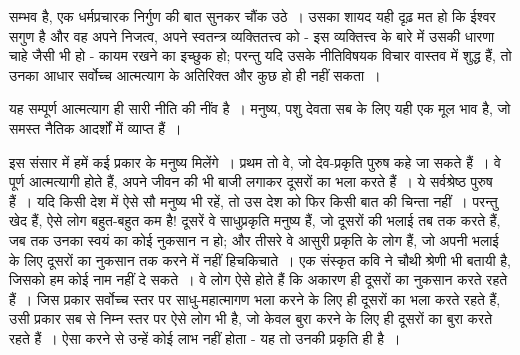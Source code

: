 \vskip 2pt

सम्भव है, एक धर्मप्रचारक निर्गुण की बात सुनकर चौंक उठे~। उसका शायद यही दृढ़ मत हो कि ईश्वर सगुण है और वह अपने निजत्व, अपने स्वतन्त्र व्यक्तितत्त्व को - इस व्यक्तित्त्व के बारे में उसकी धारणा चाहे जैसी भी हो - कायम रखने का इच्छुक हो; परन्तु यदि उसके नीतिविषयक विचार वास्तव में शुद्ध हैं, तो उनका आधार सर्वोच्च आत्मत्याग के अतिरिक्त और कुछ हो ही नहीं सकता~।

यह सम्पूर्ण आत्मत्याग ही सारी नीति की नींव है~। मनुष्य, पशु देवता सब के लिए यही एक मूल भाव है, जो समस्त नैतिक आदर्शों में व्याप्त हैं~।

इस संसार में हमें कई प्रकार के मनुष्य मिलेंगे~। प्रथम तो वे, जो देव-प्रकृति पुरुष कहे जा सकते हैं~। वे पूर्ण आत्मत्यागी होते हैं, अपने जीवन की भी बाजी लगाकर दूसरों का भला करते हैं~। ये सर्वश्रेष्ठ पुरुष हैं~। यदि किसी देश में ऐसे सौ मनुष्य भी रहें, तो उस देश को फिर किसी बात की चिन्ता नहीं~। परन्तु खेद हैं, ऐसे लोग बहुत-बहुत कम है! दूसरें वे साधुप्रकृति मनुष्य हैं, जो दूसरों की भलाई तब तक करते हैं, जब तक उनका स्वयं का कोई नुकसान न हो; और तीसरे वे आसुरी प्रकृति के लोग हैं, जो अपनी भलाई के लिए दूसरों का नुकसान तक करने में नहीं हिचकिचाते~। एक संस्कृत कवि ने चौथी श्रेणी भी बतायी है, जिसको हम कोई नाम नहीं दे सकते~। वे लोग ऐसे होते हैं कि अकारण ही दूसरों का नुकसान करते रहते हैं~। जिस प्रकार सर्वोच्च स्तर पर साधु-महात्मागण भला करने के लिए ही दूसरों का भला करते रहते हैं, उसी प्रकार सब से निम्न स्तर पर ऐसे लोग भी है, जो केवल बुरा करने के लिए ही दूसरों का बुरा करते रहते हैं~। ऐसा करने से उन्हें कोई लाभ नहीं होता - यह तो उनकी प्रकृति ही है~।

